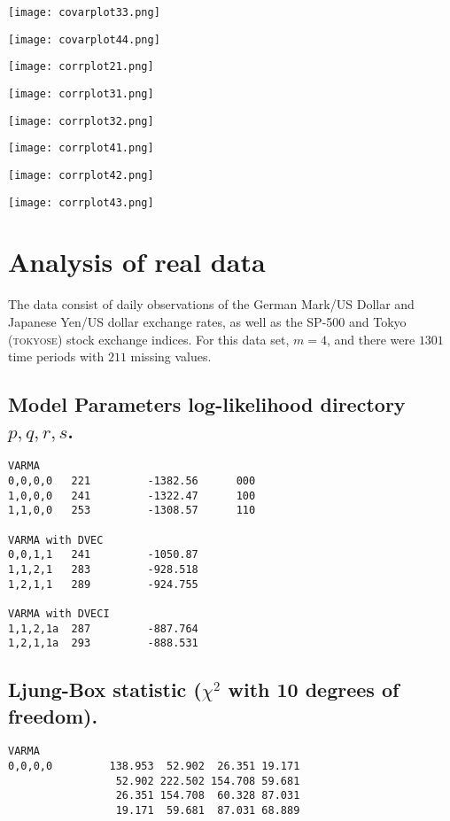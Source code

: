 {\texttt{[image: covarplot33.png]}


\texttt{[image: covarplot44.png]}

\texttt{[image: corrplot21.png]}

\texttt{[image: corrplot31.png]}

\texttt{[image: corrplot32.png]}

\texttt{[image: corrplot41.png]}

\texttt{[image: corrplot42.png]}


\texttt{[image: corrplot43.png]}



\section{Analysis of real data}

The data consist of daily observations of the German Mark/US Dollar and Japanese Yen/US dollar exchange rates, as well as the SP-500 and Tokyo 
 (\textsc{tokyose}) stock exchange indices. For this data set, $m=4$, and there
were $1301$ time periods with $211$ missing values.  

\subsection{Model Parameters log-likelihood directory $p,q,r,s$.}
\begin{lstlisting}
VARMA
0,0,0,0   221         -1382.56      000
1,0,0,0   241         -1322.47      100
1,1,0,0   253         -1308.57      110

VARMA with DVEC
0,0,1,1   241         -1050.87 
1,1,2,1   283         -928.518 
1,2,1,1   289         -924.755  

VARMA with DVECI
1,1,2,1a  287         -887.764 
1,2,1,1a  293         -888.531 
\end{lstlisting}

\bigskip
\subsection{Ljung-Box statistic ($\chi^2$ with 10 degrees of freedom).}
\begin{lstlisting}
VARMA
0,0,0,0         138.953  52.902  26.351 19.171
                 52.902 222.502 154.708 59.681
                 26.351 154.708  60.328 87.031
                 19.171  59.681  87.031 68.889



\end{lstlisting}}
